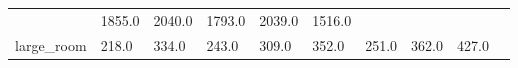 \begin{table}[t]
\begin{center}
\begin{tabular}{llllllllll}
{            } 

        
           &
           
           1855.0
           

        
           &
           
           2040.0
           

        
           &
           
           1793.0
           

        
           &
           
           2039.0
           

        
           &
           
           1516.0
           

         \\

        large_room
        
           &
           
           218.0
           

        
           &
           
           334.0
           

        
           &
           
           243.0
           

        
           &
           
           309.0
           

        
           &
           
           352.0
           

        
           &
           
           251.0
           

        
           &
           
           362.0
           

        
           &
           
           427.0
           

        
           &
           

\end{tabular}
\end{center}
\end{table}
